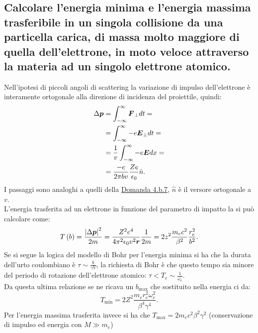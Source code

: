 \subsection[]{Calcolare l’energia minima e l'energia massima trasferibile in un singola collisione da una particella carica, di massa molto maggiore di quella dell'elettrone, in moto veloce attraverso la materia ad un singolo elettrone atomico.
}
\label{sec:4.b.14}
Nell'ipotesi di piccoli angoli di scattering la variazione di impulso dell'elettrone è interamente ortogonale alla direzione di incidenza del proiettile, quindi:
\begin{align*}
	\Delta \boldsymbol{p}&= \int_{-\infty}^{\infty} \boldsymbol{F}_{\bot} dt =\\
	&=  \int_{-\infty}^{\infty}-e \boldsymbol{E}_{\bot}dt =\\
	&= \frac{1}{v}\int_{-\infty}^{\infty}-e \boldsymbol{E}dx=\\
	&= \frac{-e}{2\pi b v} \frac{Ze}{\epsilon_0} \hat{n} 
.\end{align*}
I passaggi sono analoghi a quelli della \hyperref[sec:4.b.7]{Domanda 4.b.7}, $\hat{n}$ è il versore ortogonale a $v$.\\
L'energia trasferita ad un elettrone in funzione del parametro di impatto la si può calcolare come:
\[
	T\left( b \right)= \frac{\left| \Delta \boldsymbol{p} \right|^2 }{2m}= \frac{Z^2e^4}{4\pi^2\epsilon_0 v^2 \boldsymbol{r}}\frac{1}{2m}= 
	2z^2 \frac{m_e c^2}{\beta^2} \frac{r_e^2}{b ^2}
.\] 
Se si segue la logica del modello di Bohr per l'energia minima si ha che la durata dell'urto coulombiano è $\tau \sim \frac{b}{\gamma V}$, la richiesta di Bohr è che questo tempo sia minore del periodo di rotazione dell'elettrone atomico: $\tau< T_{e} \sim \frac{1}{\omega_{e}}$.\\
Da questa ultima relazione se ne ricava un $b_{\text{max}}$ che sostituito nella energia ci da:
\[
	T_{\text{min}}= 2Z^2 \frac{m_e r_e^2 \omega_e^2}{\beta^4 \gamma^4}
.\] 
Per l'energia massima trasferita invece si ha che $T_{\text{max}}=2m_ec^2\beta^2\gamma^2$ (conservazione di impulso ed energia con $M\gg m_e$)


